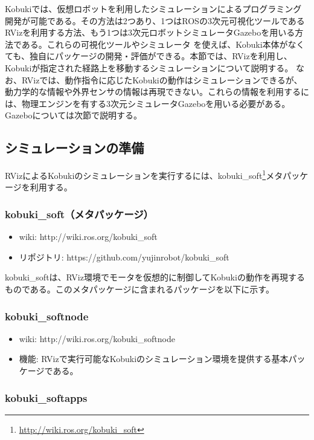 \begin{itemize}
Kobukiでは、仮想ロボットを利用したシミュレーションによるプログラミング開発が可能である。その方法は2つあり、1つはROSの3次元可視化ツールであるRVizを利用する方法、もう1つは3次元ロボットシミュレータGazeboを用いる方法である。これらの可視化ツールやシミュレータ  を使えば、Kobuki本体がなくても、独自にパッケージの開発・評価ができる。本節では、RVizを利用し、Kobukiが指定された経路上を移動するシミュレーションについて説明する。
なお、RVizでは、動作指令に応じたKobukiの動作はシミュレーションできるが、動力学的な情報や外界センサの情報は再現できない。これらの情報を利用するには、物理エンジンを有する3次元シミュレータGazeboを用いる必要がある。Gazeboについては次節で説明する。

\subsection{シミュレーションの準備}

RVizによるKobukiのシミュレーションを実行するには、kobuki\_soft\footnote{\url{http://wiki.ros.org/kobuki\_soft}}メタパッケージを利用する。

\subsubsection{kobuki\_soft（メタパッケージ）}

\begin{itemize}
\item wiki: http://wiki.ros.org/kobuki\_soft
\item リポジトリ: https://github.com/yujinrobot/kobuki\_soft
\end{itemize}

kobuki\_softは、RViz環境でモータを仮想的に制御してKobukiの動作を再現するものである。このメタパッケージに含まれるパッケージを以下に示す。

\subsubsection{kobuki\_softnode}

\begin{itemize}
\item wiki: http://wiki.ros.org/kobuki\_softnode
\item 機能: RVizで実行可能なKobukiのシミュレーション環境を提供する基本パッケージである。
\end{itemize}

\subsubsection{kobuki\_softapps}


\end{itemize}
